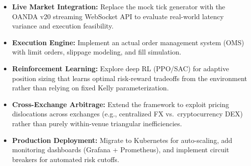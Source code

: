 \documentclass[letterpaper,11pt]{report}
\begin{document}
\begin{itemize}
    \item \textbf{Live Market Integration:} Replace the mock tick generator with the OANDA v20 streaming WebSocket API to evaluate real-world latency variance and execution feasibility.

    \item \textbf{Execution Engine:} Implement an actual order management system (OMS) with limit orders, slippage modeling, and fill simulation.

    \item \textbf{Reinforcement Learning:} Explore deep RL (PPO/SAC) for adaptive position sizing that learns optimal risk-reward tradeoffs from the environment rather than relying on fixed Kelly parameterization.

    \item \textbf{Cross-Exchange Arbitrage:} Extend the framework to exploit pricing dislocations across exchanges (e.g., centralized FX vs.\ cryptocurrency DEX) rather than purely within-venue triangular inefficiencies.

    \item \textbf{Production Deployment:} Migrate to Kubernetes for auto-scaling, add monitoring dashboards (Grafana + Prometheus), and implement circuit breakers for automated risk cutoffs.
\end{itemize}
\end{document}
